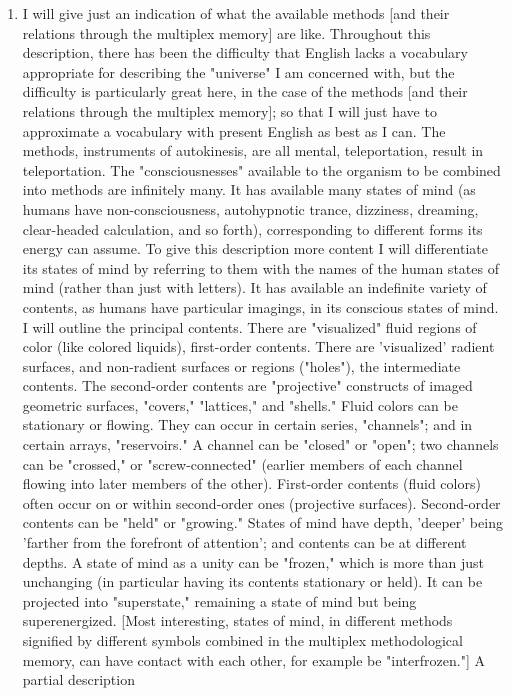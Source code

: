 \begin{enumerate}
\item I will give just an indication of what the available methods [and 
their relations through the multiplex memory] are like. Throughout this 
description, there has been the difficulty that English lacks a vocabulary 
appropriate for describing the "universe" I am concerned with, but the 
difficulty is particularly great here, in the case of the methods [and their 
relations through the multiplex memory]; so that I will just have to 
approximate a vocabulary with present English as best as I can. The 
methods, instruments of autokinesis, are all mental, teleportation, result in 
teleportation. The "consciousnesses" available to the organism to be 
combined into methods are infinitely many. It has available many states of 
mind (as humans have non-consciousness, autohypnotic trance, dizziness, 
dreaming, clear-headed calculation, and so forth), corresponding to different 
forms its energy can assume. To give this description more content I will 
differentiate its states of mind by referring to them with the names of the 
human states of mind (rather than just with letters). It has available an 
indefinite variety of contents, as humans have particular imagings, in its 
conscious states of mind. I will outline the principal contents. There are 
"visualized" fluid regions of color (like colored liquids), first-order contents. 
There are 'visualized' radient surfaces, and non-radient surfaces or regions 
("holes"), the intermediate contents. The second-order contents are 
"projective" constructs of imaged geometric surfaces, "covers," "lattices," 
and "shells." Fluid colors can be stationary or flowing. They can occur in 
certain series, "channels"; and in certain arrays, "reservoirs." A channel can 
be "closed" or "open"; two channels can be "crossed," or 
"screw-connected" (earlier members of each channel flowing into later 
members of the other). First-order contents (fluid colors) often occur on or 
within second-order ones (projective surfaces). Second-order contents can be 
"held" or "growing." States of mind have depth, 'deeper' being 'farther from 
the forefront of attention'; and contents can be at different depths. A state 
of mind as a unity can be "frozen," which is more than just unchanging (in 
particular having its contents stationary or held). It can be projected into 
"superstate," remaining a state of mind but being superenergized. [Most 
interesting, states of mind, in different methods signified by different 
symbols combined in the multiplex methodological memory, can have 
contact with each other, for example be "interfrozen."] A partial description 

\end{enumerate}
